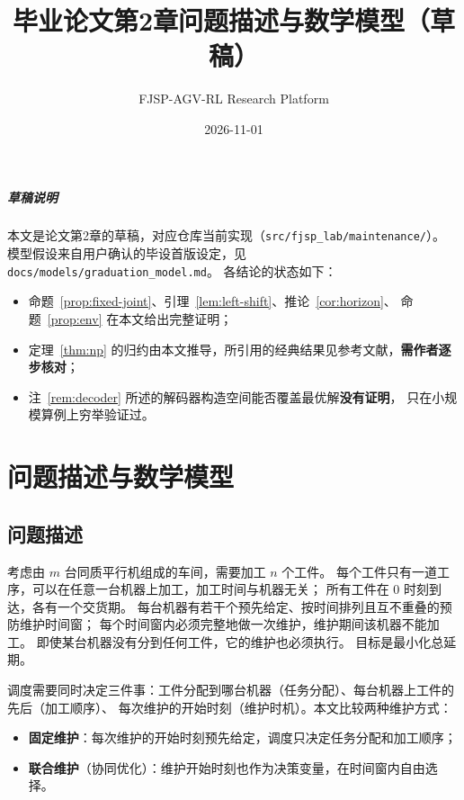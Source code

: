 \documentclass[11pt,oneside,notitlepage]{ctexrep}
\title{毕业论文第2章\quad 问题描述与数学模型（草稿）}
\author{FJSP-AGV-RL Research Platform}
\date{2026-11-01}
\theoremstyle{definition}
\theoremstyle{remark}
\begin{document}
\maketitle

\paragraph{草稿说明}
本文是论文第2章的草稿，对应仓库当前实现（\texttt{src/fjsp\_lab/maintenance/}）。
模型假设来自用户确认的毕设首版设定，见 \texttt{docs/models/graduation\_model.md}。
各结论的状态如下：
\begin{itemize}[nosep]
  \item 命题~\ref{prop:fixed-joint}、引理~\ref{lem:left-shift}、推论~\ref{cor:horizon}、
        命题~\ref{prop:env} 在本文给出完整证明；
  \item 定理~\ref{thm:np} 的归约由本文推导，所引用的经典结果见参考文献，\textbf{需作者逐步核对}；
  \item 注~\ref{rem:decoder} 所述的解码器构造空间能否覆盖最优解\textbf{没有证明}，
        只在小规模算例上穷举验证过。
\end{itemize}

\setcounter{chapter}{1}
\chapter{问题描述与数学模型}

\section{问题描述}

考虑由 $m$ 台同质平行机组成的车间，需要加工 $n$ 个工件。
每个工件只有一道工序，可以在任意一台机器上加工，加工时间与机器无关；
所有工件在 0 时刻到达，各有一个交货期。
每台机器有若干个预先给定、按时间排列且互不重叠的预防维护时间窗；
每个时间窗内必须完整地做一次维护，维护期间该机器不能加工。
即使某台机器没有分到任何工件，它的维护也必须执行。
目标是最小化总延期。

调度需要同时决定三件事：工件分配到哪台机器（任务分配）、每台机器上工件的先后（加工顺序）、
每次维护的开始时刻（维护时机）。本文比较两种维护方式：
\begin{itemize}[nosep]
  \item \textbf{固定维护}：每次维护的开始时刻预先给定，调度只决定任务分配和加工顺序；
  \item \textbf{联合维护}（协同优化）：维护开始时刻也作为决策变量，在时间窗内自由选择。
\end{itemize}
\end{document}

